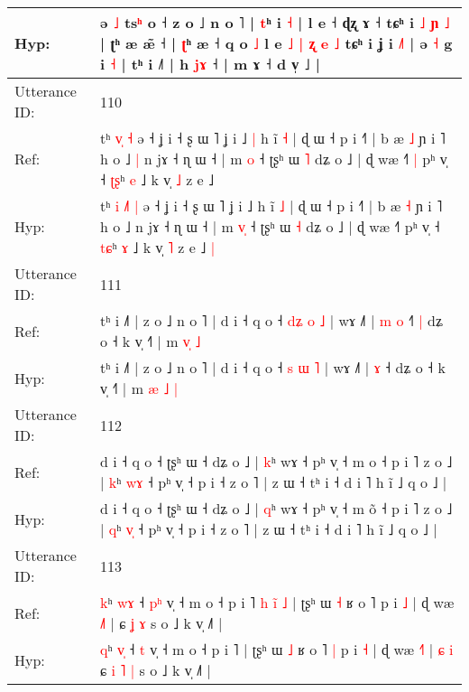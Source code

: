 \documentclass[10pt]{article}
\DeclareRobustCommand{\hl}[1]{{\textcolor{red}{#1}}}
\begin{document}
\begin{longtable}{ll}
 \\
Hyp: & ə \hl{˩} ts\hl{ʰ} o ˧\hl{}\hl{} z o ˩ n o ˥ | \hl{}\hl{t}ʰ\hl{}\hl{}\hl{}\hl{}\hl{}\hl{}\hl{}\hl{}\hl{}\hl{}\hl{}\hl{} i \hl{˧} | l e ˧ ɖʐ ɤ ˧\hl{}\hl{}\hl{} tɕʰ i\hl{}\hl{} \hl{˩} \hl{}\hl{ɲ} \hl{˩} | ʈʰ æ æ̃ ˧ | \hl{ʈ}ʰ\hl{}\hl{}\hl{}\hl{}\hl{}\hl{}\hl{} æ ˧ q o\hl{}\hl{} \hl{˩} l e \hl{˩} \hl{}\hl{|} \hl{ʐ} \hl{}\hl{e} \hl{˩} tɕʰ i\hl{}\hl{} ʝ i\hl{}\hl{} \hl{}\hl{}\hl{˩}˥ | ə \hl{˧} g i \hl{˧} | tʰ i ˩˥ | h \hl{j}\hl{ɤ} ˧ | m ɤ ˧ d v̩ ˩ |
 \\
\midrule
Utterance ID: & 110 \\
Ref: & tʰ\hl{}\hl{} \hl{v}\hl{̩} \hl{˧} ə ˧ ʝ i ˧ ʂ ɯ ˥ ʝ i ˩\hl{ }\hl{|} h ĩ \hl{˧} | ɖ ɯ ˧ p i ˧˥ | b æ \hl{˩} ɲ i ˥ h o ˩\hl{ }\hl{|} n jɤ ˧ ɳ ɯ ˧ | m \hl{}\hl{o} ˧ ʈʂʰ ɯ \hl{˥} dʑ o ˩ | ɖ wæ ˧˥\hl{ }\hl{|} pʰ v̩ ˧ \hl{ʈ}\hl{ʂ}ʰ \hl{e} ˩ k v̩ \hl{˩} z e ˩\hl{}\hl{}
 \\
Hyp: & tʰ\hl{ }\hl{i} \hl{˩}\hl{˥} \hl{|} ə ˧ ʝ i ˧ ʂ ɯ ˥ ʝ i ˩\hl{}\hl{} h ĩ \hl{˩} | ɖ ɯ ˧ p i ˧˥ | b æ \hl{˧} ɲ i ˥ h o ˩\hl{}\hl{} n jɤ ˧ ɳ ɯ ˧ | m \hl{v}\hl{̩} ˧ ʈʂʰ ɯ \hl{˧} dʑ o ˩ | ɖ wæ ˧˥\hl{}\hl{} pʰ v̩ ˧ \hl{t}\hl{ɕ}ʰ \hl{ɤ} ˩ k v̩ \hl{˥} z e ˩\hl{ }\hl{|}
 \\
\midrule
Utterance ID: & 111 \\
Ref: & tʰ i ˩˥ | z o ˩ n o ˥ | d i ˧ q o ˧ \hl{d}\hl{ʑ} \hl{o} \hl{˩} | wɤ ˩˥ |\hl{ }\hl{m} \hl{o} ˧\hl{˥}\hl{ }\hl{|} dʑ o ˧ k v̩ ˧˥ | m \hl{}\hl{v}\hl{̩} \hl{˩}
 \\
Hyp: & tʰ i ˩˥ | z o ˩ n o ˥ | d i ˧ q o ˧ \hl{}\hl{s} \hl{ɯ} \hl{˥} | wɤ ˩˥ |\hl{}\hl{} \hl{ɤ} ˧\hl{}\hl{}\hl{} dʑ o ˧ k v̩ ˧˥ | m \hl{æ}\hl{ }\hl{˩} \hl{|}
 \\
\midrule
Utterance ID: & 112 \\
Ref: & d i ˧ q o ˧ ʈʂʰ ɯ ˧ dʑ o ˩ | \hl{k}ʰ wɤ ˧ pʰ v̩ ˧ m o\hl{} ˧ p i ˥ z o ˩ | \hl{k}ʰ \hl{w}\hl{ɤ} ˧ pʰ v̩ ˧ p i ˧ z o ˥ | z ɯ ˧ tʰ i ˧ d i ˥ h ĩ ˩ q o ˩ |
 \\
Hyp: & d i ˧ q o ˧ ʈʂʰ ɯ ˧ dʑ o ˩ | \hl{q}ʰ wɤ ˧ pʰ v̩ ˧ m o\hl{̃} ˧ p i ˥ z o ˩ | \hl{q}ʰ \hl{v}\hl{̩} ˧ pʰ v̩ ˧ p i ˧ z o ˥ | z ɯ ˧ tʰ i ˧ d i ˥ h ĩ ˩ q o ˩ |
 \\
\midrule
Utterance ID: & 113 \\
Ref: & \hl{k}ʰ \hl{w}\hl{ɤ} ˧ \hl{p}\hl{ʰ} v̩ ˧ m o ˧ p i ˥\hl{ }\hl{h}\hl{ }\hl{i}\hl{̃}\hl{ }\hl{˩} | ʈʂʰ ɯ \hl{˧} ʁ o ˥\hl{}\hl{} p i \hl{˩} | ɖ wæ \hl{˩}˥ |\hl{}\hl{}\hl{}\hl{} ɕ\hl{}\hl{} \hl{ʝ} \hl{ɤ} s o ˩ k v̩ ˩˥ |
 \\
Hyp: & \hl{q}ʰ \hl{v}\hl{̩} ˧ \hl{}\hl{t} v̩ ˧ m o ˧ p i ˥\hl{}\hl{}\hl{}\hl{}\hl{}\hl{}\hl{} | ʈʂʰ ɯ \hl{˩} ʁ o ˥\hl{ }\hl{|} p i \hl{˧} | ɖ wæ \hl{˧}˥ |\hl{ }\hl{ɕ}\hl{ }\hl{i} ɕ\hl{ }\hl{i} \hl{˥} \hl{|} s o ˩ k v̩ ˩˥ |

\end{longtable}
\end{document}
